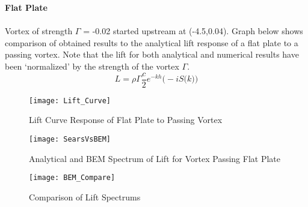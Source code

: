 \documentclass{article}
\begin{document}
\noindent \textbf{Flat Plate} \\ \\
Vortex of strength $\Gamma$ = -0.02 started upstream at (-4.5,0.04). Graph below shows comparison of obtained results to the analytical lift response of a flat plate to a passing vortex. Note that the lift for both analytical and numerical results have been `normalized' by the strength of the vortex $\Gamma$.\\
\begin{equation}
L = \rho \Gamma \frac{c}{2} e^{-kh} \big(-i S\big(k \big) \big)
\end{equation}

\begin{figure}[h]
\texttt{[image: Lift\_Curve]}
\centering
\caption{Lift Curve Response of Flat Plate to Passing Vortex}
\end{figure}

\begin{figure}[h]
\texttt{[image: SearsVsBEM]}
\centering
\caption{Analytical and BEM Spectrum of Lift for Vortex Passing Flat Plate}
\end{figure}
\newpage

\begin{figure}[h]
\texttt{[image: BEM\_Compare]}
\centering
\caption{Comparison of Lift Spectrums}
\end{figure}
\end{document}
